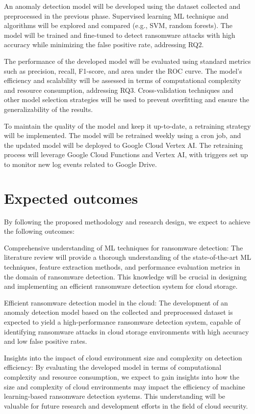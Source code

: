 \documentclass[12pt,a4paper,twoside]{article}
\begin{document}
An anomaly detection model will be developed using the dataset collected and preprocessed in the previous phase. Supervised learning ML technique and algorithms will be explored and compared (e.g., SVM, random forests). The model will be trained and fine-tuned to detect ransomware attacks with high accuracy while minimizing the false positive rate, addressing RQ2.

The performance of the developed model will be evaluated using standard metrics such as precision, recall, F1-score, and area under the ROC curve. The model's efficiency and scalability will be assessed in terms of computational complexity and resource consumption, addressing RQ3. Cross-validation techniques and other model selection strategies will be used to prevent overfitting and ensure the generalizability of the results.

To maintain the quality of the model and keep it up-to-date, a retraining strategy will be implemented. The model will be retrained weekly using a cron job, and the updated model will be deployed to Google Cloud Vertex AI. The retraining process will leverage Google Cloud Functions and Vertex AI, with triggers set up to monitor new log events related to Google Drive.


\section{Expected outcomes}
\label{sec:outcome}

By following the proposed methodology and research design, we expect to achieve the following outcomes:

Comprehensive understanding of ML techniques for ransomware detection: The literature review will provide a thorough understanding of the state-of-the-art ML techniques, feature extraction methods, and performance evaluation metrics in the domain of ransomware detection. This knowledge will be crucial in designing and implementing an efficient ransomware detection system for cloud storage.

Efficient ransomware detection model in the cloud: The development of an anomaly detection model based on the collected and preprocessed dataset is expected to yield a high-performance ransomware detection system, capable of identifying ransomware attacks in cloud storage environments with high accuracy and low false positive rates.

Insights into the impact of cloud environment size and complexity on detection efficiency: By evaluating the developed model in terms of computational complexity and resource consumption, we expect to gain insights into how the size and complexity of cloud environments may impact the efficiency of machine learning-based ransomware detection systems. This understanding will be valuable for future research and development efforts in the field of cloud security.
\end{document}
